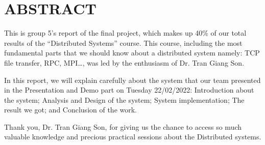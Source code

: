 \newpage
\vspace{6cm}
\section{ABSTRACT}
\hspace{0.7cm}This is group 5’s report of the final project, which makes up 40\% of our total results of the “Distributed Systems” course. This course, including the most fundamental parts that we should know about a distributed system namely: TCP file transfer, RPC, MPI…, was led by the enthusiasm of Dr. Tran Giang Son.

\vspace{0.7cm}In this report, we will explain carefully about the system that our team presented in the Presentation and Demo part on Tuesday 22/02/2022: Introduction about the system; Analysis and Design of the system; System implementation; The result we got; and Conclusion of the work.

\vspace{0.7cm}Thank you, Dr. Tran Giang Son, for giving us the chance to access so much valuable knowledge and precious practical sessions about the Distributed systems. 